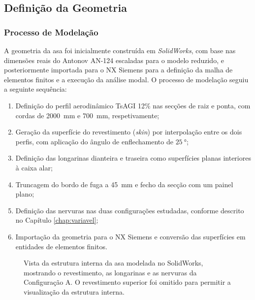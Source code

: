 \documentclass[a4paper,fleqn,noprintline]{cas-dc}
\begin{document}
\subsection{Definição da Geometria}

\subsubsection{Processo de Modelação}

A geometria da asa foi inicialmente construída em \textit{SolidWorks}, com base nas dimensões reais do Antonov AN-124 escaladas para o modelo reduzido, e posteriormente importada para o NX Siemens para a definição da malha de elementos finitos e a execução da análise modal. O processo de modelação seguiu a seguinte sequência:

\begin{enumerate}
    \item Definição do perfil aerodinâmico TsAGI 12\% nas secções de raiz e ponta, com cordas de \SI{2000}{\milli\meter} e \SI{700}{\milli\meter}, respetivamente;
    \item Geração da superfície do revestimento (\textit{skin}) por interpolação entre os dois perfis, com aplicação do ângulo de enflechamento de $\qty{25}{\degree}$;
    \item Definição das longarinas dianteira e traseira como superfícies planas interiores à caixa alar;
    \item Truncagem do bordo de fuga a \SI{45}{\milli\meter} e fecho da secção com um painel plano;
    \item Definição das nervuras nas duas configurações estudadas, conforme descrito no Capítulo \ref{chap:variavel};
    \item Importação da geometria para o NX Siemens e conversão das superfícies em entidades de elementos finitos.
\end{enumerate}

\begin{figure}[h!]
    \centering
    \caption{Vista da estrutura interna da asa modelada no SolidWorks, mostrando o revestimento, as longarinas e as nervuras da Configuração A. O revestimento superior foi omitido para permitir a visualização da estrutura interna.}
    \label{fig:asa_sw}
\end{figure}
\end{document}

